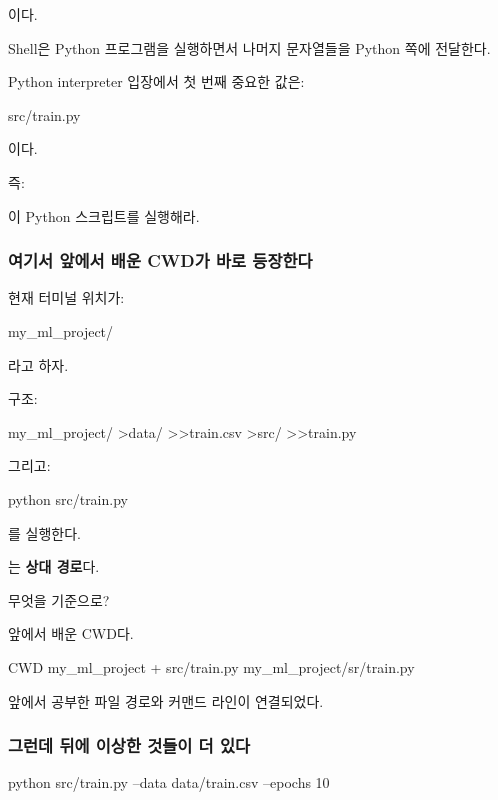 이다.

Shell은 Python 프로그램을 실행하면서 나머지 문자열들을 Python 쪽에 전달한다.

Python interpreter 입장에서 첫 번째 중요한 값은:

\begin{dhkzsh}
src/train.py
\end{dhkzsh}

이다.

즉:

\begin{dhksmry}
이 Python 스크립트를 실행해라.
\end{dhksmry}

\subsubsection{여기서 앞에서 배운 CWD가 바로 등장한다}

현재 터미널 위치가:

\begin{dhkzsh}
my_ml_project/
\end{dhkzsh}

라고 하자.

구조:

\begin{dhkdir}
my_ml_project/
>data/
>>train.csv
>src/
>>train.py
\end{dhkdir}

그리고:

\begin{dhkzsh}
python src/train.py
\end{dhkzsh}

를 실행한다.

는 \textbf{상대 경로}다.

무엇을 기준으로?

앞에서 배운 CWD다.

\begin{dhksmry}[centered]
CWD
\da
my_ml_project
+
src/train.py
\da
my_ml_project/sr/train.py
\end{dhksmry}

앞에서 공부한 파일 경로와 커맨드 라인이 연결되었다.

\subsubsection{그런데 뒤에 이상한 것들이 더 있다}

\begin{dhkzsh}
python src/train.py --data data/train.csv --epochs 10
\end{dhkzsh}

